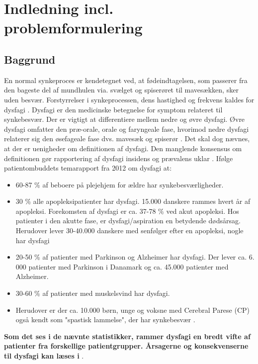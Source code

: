 \chapter{Indledning incl. problemformulering}

\section{Baggrund}
En normal synkeproces er kendetegnet ved, at fødeindtagelsen, som passerer fra den bageste del af mundhulen via. svælget og spiserøret til mavesækken, sker uden besvær. Forstyrrelser i synkeprocessen, dens hastighed og frekvens kaldes for dysfagi \cite{Sundhedsstyrelsen2015NationalDysfagi}. Dysfagi er den medicinske betegnelse for symptom relateret til synkebesvær. Der er vigtigt at differentiere mellem nedre og øvre dysfagi. Øvre dysfagi omfatter den præ-orale, orale og faryngeale fase, hvorimod nedre dysfagi relaterer sig den øsefageale fase dvs. mavesæk og spiserør \cite{KjaersgaardPh.d.studerendeDYSFAGIKonsekvenser}. Det skal dog nævnes, at der er uenigheder om definitionen af dysfagi. Den manglende konsensus om definitionen gør rapportering af dysfagi insidens og prævalens uklar \cite{KjaersgaardPh.d.studerendeDYSFAGIKonsekvenser}. Ifølge patientombuddets temarapport fra 2012 om dysfagi at:

\begin{itemize}
\item 60-87 \% af beboere på plejehjem for ældre har synkebesværligheder.
\item 30 \% alle apopleksipatienter har dysfagi. 15.000 danskere rammes hvert år af apopleksi. Forekomsten af dysfagi er ca. 37-78 \% ved akut apopleksi. Hos patienter i den akutte fase, er dysfagi/aspiration en betydende dødsårsag. Herudover lever 30-40.000 danskere med senfølger efter en apopleksi, nogle har dysfagi
\item 20-50 \% af patienter med Parkinson og Alzheimer har dysfagi. Der lever ca. 6. 000 patienter med Parkinson i Danamark og ca. 45.000 patienter med Alzheimer.  
\item 30-60 \% af patienter med muskelsvind har dysfagi.
\item Herudover er der ca. 10.000 børn, unge og voksne med Cerebral Parese (CP) også kendt som "spastisk lammelse", der har synkebesvær \cite{Bommersholdt2012TemarapportDysfagi}. 
\end{itemize}

\textbf{Som det ses i de nævnte statistikker, rammer dysfagi en bredt vifte af patienter fra forskellige patientgrupper. Årsagerne og konsekvenserne til dysfagi kan læses i} . 

